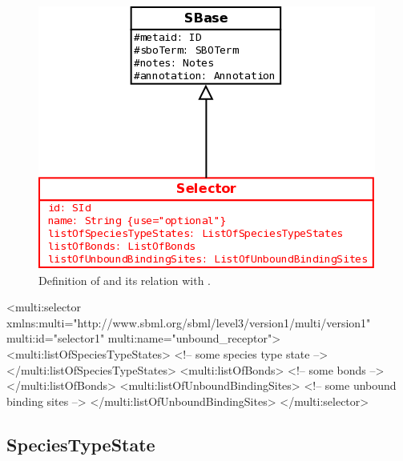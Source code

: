 \begin{figure}[H]
\begin{center}
\includegraphics[scale=0.3]{figs/pngs/SelectorClass.png} 
\caption{Definition of  and its relation with .}
\label{fig:SelectorClass}
\end{center}
\end{figure}

\begin{example}
<multi:selector 
                xmlns:multi="http://www.sbml.org/sbml/level3/version1/multi/version1" 
                multi:id="selector1"
                multi:name="unbound_receptor">
  <multi:listOfSpeciesTypeStates>
    <!-- some species type state -->
  </multi:listOfSpeciesTypeStates>
  <multi:listOfBonds>
    <!-- some bonds -->
  </multi:listOfBonds>
  <multi:listOfUnboundBindingSites>
    <!-- some unbound binding sites -->
  </multi:listOfUnboundBindingSites>
</multi:selector>
\end{example}

\subsection{SpeciesTypeState}

